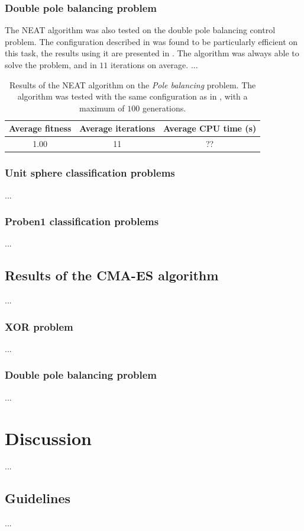 \subsubsection{Double pole balancing problem}

The NEAT algorithm was also tested on the double pole balancing control problem.
The configuration described in \cite{neat} was found to be particularly efficient on this task, the results using it are presented in .
The algorithm was always able to solve the problem, and in $11$ iterations on average. ... %

\begin{table}
    \caption{Results of the NEAT algorithm on the \textit{Pole balancing} problem. The algorithm was tested with the same configuration as in \cite{neat}, with a maximum of $100$ generations.}
    \centering
    \label{tab:nneat_pole}
    \begin{tabular}{ |c|c|c| }
        \hline
        Average fitness & Average iterations & Average CPU time (s) \\
        \hline
        1.00 & 11 &?? \\
        \hline\hline
    \end{tabular}
\end{table}

\subsubsection{Unit sphere classification problems}

...

\subsubsection{Proben1 classification problems}

...

\subsection{Results of the CMA-ES algorithm}

...

\subsubsection{XOR problem}

...

\subsubsection{Double pole balancing problem}

...

\section{Discussion}

...

\subsection{Guidelines}

...
